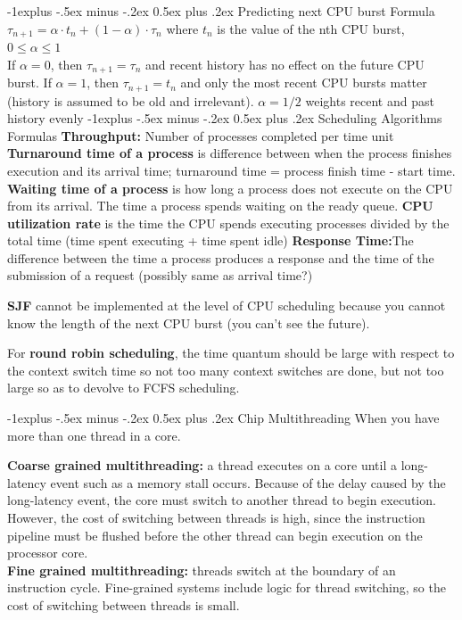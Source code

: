 \documentclass[letterpaper, 8pt]{extarticle}
\makeatletter
\renewcommand{\subsection}{\@startsection{subsection}{2}{0mm}%
                                {-1explus -.5ex minus -.2ex}%
                                {0.5ex plus .2ex}%
                                {\normalfont\small\bfseries}}
\makeatother
\begin{document}
\begin{multicols*}{6}
    \subsection{Predicting next CPU burst Formula}
    $\tau_{n+1} = \alpha \cdot t_n + (1-\alpha) \cdot \tau_n$
    where $t_n$ is the value of the nth CPU burst, $0 \leq \alpha \leq 1$ \\
    If $\alpha = 0$, then $\tau_{n+1} = \tau_n$ and recent history has
    no effect on the future CPU burst. If $\alpha = 1$, then
    $\tau_{n+1} = t_n$ and only the most recent CPU bursts matter (history
    is assumed to be old and irrelevant). $\alpha = 1/2$ weights recent
    and past history evenly
    \subsection{Scheduling Algorithms Formulas}
    \textbf{Throughput:} Number of processes completed per time unit
    \textbf{Turnaround time of a process} is difference between when
    the process finishes execution and its arrival time;
    turnaround time = process finish time - start time.
    \textbf{Waiting time of a process} is how long a process does not execute
    on the CPU from its arrival. The time a process spends waiting on the
    ready queue.
    \textbf{CPU utilization rate} is the time the CPU spends executing
    processes divided by the total time (time spent executing + time spent idle)
    \textbf{Response Time:}The difference between the time a process
    produces a response and the time of the submission of a request
    (possibly same as arrival time?)

    \textbf{SJF} cannot be implemented at the level of CPU scheduling because
    you cannot know the length of the next CPU burst (you can't see the future).

    For \textbf{round robin scheduling}, the time quantum should be large
    with respect to the context switch time so not too many context switches
    are done, but not too large so as to devolve to FCFS scheduling.

    \subsection{Chip Multithreading}
    When you have more than one thread in a core.

    \textbf{Coarse grained multithreading:} a thread executes on a core until a
    long-latency event such as a memory stall occurs. Because of the delay
    caused by the long-latency event, the core must switch to another thread to
    begin execution. However, the cost of switching between threads is high,
    since the instruction pipeline must be flushed before the other thread can
    begin execution on the processor core. \\
    \textbf{Fine grained multithreading:} threads switch at the boundary of
    an instruction cycle. Fine-grained systems include logic
    for thread switching, so the cost of switching between threads is small.


\end{multicols*}
\end{document}
